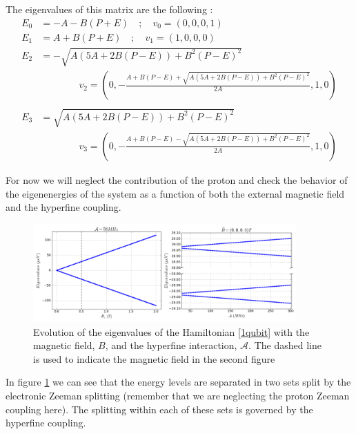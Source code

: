 The eigenvalues of this matrix are the following :
\begin{equation}
  \begin{split}
    E_0 &= -A-B(P+E) \quad;\quad v_0=\left(0,0,0,1\right)\\
    E_1 &= A+B(P+E) \quad;\quad v_1=\left(1,0,0,0\right)\\
    E_2 &= -\sqrt{A(5A+2B(P-E)) + B^2 (P-E)^2} \\
        &\quad\quad\quad\quad v_2 =\left(0,-\frac{A+B(P-E)+\sqrt{A(5A+2B(P-E)) + B^2 (P-E)^2}}{2 A},1,0\right)\\
    \quad\\
    E_3 &= \sqrt{A(5A+2B(P-E)) + B^2 (P-E)^2}\\
        &\quad\quad\quad\quad v_3 = \left(0,-\frac{A+B(P-E)-\sqrt{A(5A+2B(P-E)) + B^2 (P-E)^2}}{2 A},1,0\right)
  \end{split}
\label{eig}
\end{equation}



For now we will neglect the contribution of the proton and check the behavior of the eigenenergies of the system as a function of both the external magnetic field and the hyperfine coupling.
\begin{figure}[h!]
\centering
\includegraphics[width=0.9\textwidth]{chapter03/figures/spectrum.png}
\vspace{-5pt}
\caption{Evolution of the eigenvalues of the Hamiltonian \eqref{1qubit} with the magnetic field, $B$, and the hyperfine interaction, $\mathcal{A}$. The dashed line is used to indicate the magnetic field in the second figure}
\label{spectrum}
\end{figure}
\FloatBarrier
In figure \ref{spectrum} we can see that the energy levels are separated in two sets split by the electronic Zeeman splitting (remember that we are neglecting the proton Zeeman coupling here). The splitting within each of these sets is governed by the hyperfine coupling.

